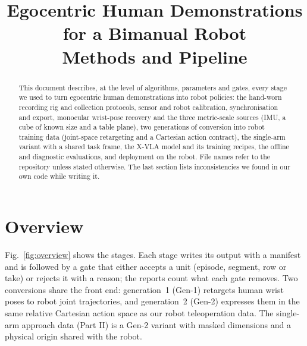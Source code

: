 \documentclass[conference,10pt]{IEEEtran}
\begin{document}
\title{Egocentric Human Demonstrations for a Bimanual Robot\\Methods and Pipeline}
\author{
}
\maketitle

\begin{abstract}
This document describes, at the level of algorithms, parameters and gates, every stage we used to turn egocentric human
demonstrations into robot policies: the hand-worn recording rig and collection protocols, sensor and robot calibration,
synchronisation and export, monocular wrist-pose recovery and the three metric-scale sources (IMU, a cube of known size and a
table plane), two generations of conversion into robot training data (joint-space retargeting and a Cartesian action contract),
the single-arm variant with a shared task frame, the X-VLA model and its training recipes, the offline and diagnostic
evaluations, and deployment on the robot. File names refer to the repository unless stated otherwise. The last section lists
inconsistencies we found in our own code while writing it.
\end{abstract}

\section{Overview}
Fig.~\ref{fig:overview} shows the stages. Each stage writes its output with a manifest and is followed by a gate that either
accepts a unit (episode, segment, row or take) or rejects it with a reason; the reports count what each gate removes. Two
conversions share the front end: generation~1 (Gen-1) retargets human wrist poses to robot joint trajectories, and generation~2
(Gen-2) expresses them in the same relative Cartesian action space as our robot teleoperation data. The single-arm approach data
(Part II) is a Gen-2 variant with masked dimensions and a physical origin shared with the robot.
\end{document}
